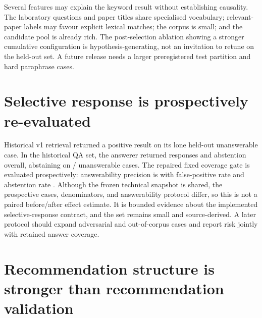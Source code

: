 Several features may explain the keyword result without establishing causality. The laboratory questions and paper titles share specialised vocabulary; relevant-paper labels may favour explicit lexical matches; the corpus is small; and the candidate pool is already rich. The post-selection ablation showing a stronger cumulative configuration is hypothesis-generating, not an invitation to retune on the held-out set. A future release needs a larger preregistered test partition and hard paraphrase cases.

\section{Selective response is prospectively re-evaluated}

Historical v1 retrieval returned a positive result on its lone held-out unanswerable case. In the historical QA set, the answerer returned \QaResponseCount{} responses and \QaAbstentionCount{} abstention overall, abstaining on \QaUnanswerableAbstentionCount{}/\QaUnanswerableCaseCount{} unanswerable cases. The repaired fixed coverage gate is evaluated prospectively: answerability precision is \VTwoQAAnswerabilityPrecision{} with false-positive rate \VTwoQAFalsePositiveRate{} and abstention rate \VTwoQAAbstentionRate{}. Although the frozen technical snapshot is shared, the prospective cases, denominators, and answerability protocol differ, so this is not a paired before/after effect estimate. It is bounded evidence about the implemented selective-response contract, and the set remains small and source-derived. A later protocol should expand adversarial and out-of-corpus cases and report risk jointly with retained answer coverage.

\section{Recommendation structure is stronger than recommendation validation}

